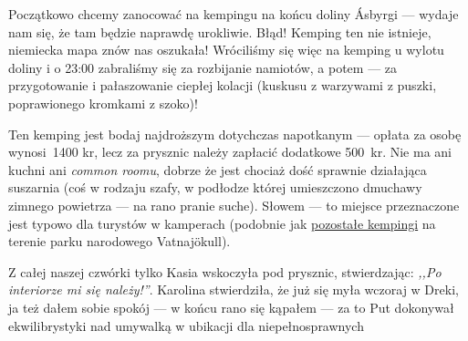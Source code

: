 
Początkowo chcemy zanocować na kempingu na końcu doliny Ásbyrgi --- wydaje nam się, że tam będzie naprawdę urokliwie. Błąd! Kemping ten nie istnieje, niemiecka mapa znów nas oszukała! Wróciliśmy się więc na kemping u wylotu doliny i o 23:00 zabraliśmy się za rozbijanie namiotów, a potem --- za przygotowanie i pałaszowanie ciepłej kolacji (kuskusu z warzywami z puszki, poprawionego kromkami z szoko)!

Ten kemping jest bodaj najdroższym dotychczas napotkanym --- opłata za osobę wynosi~1400 kr, lecz za prysznic należy zapłacić dodatkowe 500~kr. Nie ma ani kuchni ani \emph{common roomu}, dobrze że jest chociaż dość sprawnie działająca suszarnia (coś w rodzaju szafy, w podłodze której umieszczono dmuchawy zimnego powietrza --- na rano pranie suche). Słowem --- to miejsce przeznaczone jest typowo dla turystów w kamperach (podobnie jak \href{http://www.vatnajokulsthjodgardur.is/english/plan-your-visit/camping/}{pozostałe kempingi} na terenie parku narodowego Vatnajökull).

Z całej naszej czwórki tylko Kasia wskoczyła pod prysznic, stwierdzając: \emph{,,Po interiorze mi się należy!''}. Karolina stwierdziła, że już się myła wczoraj  w Dreki, ja też dałem sobie spokój --- w końcu rano się kąpałem --- za to Put dokonywał ekwilibrystyki nad umywalką w ubikacji dla niepełnosprawnych \wink

